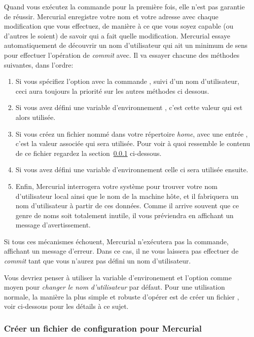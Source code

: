 Quand vous exécutez la commande  pour la première fois, elle
n'est pas garantie de réussir. Mercurial enregistre votre nom et votre 
adresse avec chaque modification que vous effectuez, de manière à ce que
vous soyez capable (ou d'autres le soient) de savoir qui a fait quelle
modification. Mercurial essaye automatiquement de découvrir un nom 
d'utilisateur qui ait un minimum de sens pour effectuer l'opération
de \textit{commit} avec. Il va essayer chacune des méthodes suivantes,
dans l'ordre:
\begin{enumerate}
\item Si vous spécifiez l'option  avec la commande 
  , suivi d'un nom d'utilisateur, ceci aura toujours la 
  priorité sur les autres méthodes ci dessous.
\item Si vous avez défini une variable d'environnement , 
  c'est cette valeur qui est alors utilisée.
\item Si vous créez un fichier nommé  dans votre 
   répertoire \textit{home}, avec une entrée , 
   c'est la valeur associée qui sera utilisée. Pour voir à quoi 
   ressemble le contenu de ce fichier regardez la 
   section~\ref{sec:tour-basic:username} ci-dessous.
\item Si vous avez défini une variable d'environnement 
  celle ci sera utilisée ensuite.
\item Enfin, Mercurial interrogera votre système pour trouver votre
  nom d'utilisateur local ainsi que le nom de la machine hôte, et il 
  fabriquera un nom d'utilisateur à partir de ces données. Comme il arrive
  souvent que ce genre de noms soit totalement inutile, il vous 
  préviendra en affichant un message d'avertissement.
\end{enumerate}

Si tous ces mécanismes échouent, Mercurial n'exécutera pas la commande,
affichant un message d'erreur. Dans ce cas, il ne vous laissera pas 
effectuer de \textit{commit} tant que vous n'aurez pas défini un nom
d'utilisateur.

Vous devriez penser à utiliser la variable d'environement  
et l'option  comme moyen pour \emph{changer le nom
d'utilisateur} par défaut. Pour une utilisation normale, la manière la plus
simple et robuste d'opérer est de créer un fichier ,
voir ci-dessous pour les détails à ce sujet.

\subsubsection{Créer un fichier de configuration pour Mercurial}
\label{sec:tour-basic:username}

